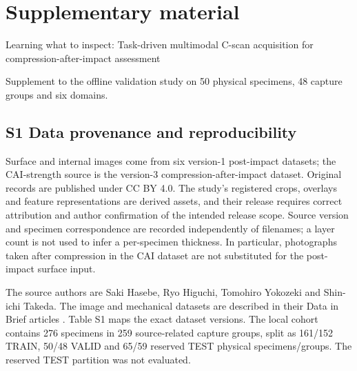 \documentclass[11pt,a4paper]{article}
\begin{document}
\section{Supplementary material}\label{supplementary-material}

Learning what to inspect: Task-driven multimodal C-scan acquisition for compression-after-impact assessment

Supplement to the offline validation study on 50 physical specimens, 48 capture groups and six domains.

\subsection{S1 Data provenance and reproducibility}\label{s1-data-provenance-and-reproducibility}

Surface and internal images come from six version-1 post-impact datasets; the CAI-strength source is the version-3 compression-after-impact dataset. Original records are published under CC BY 4.0. The study's registered crops, overlays and feature representations are derived assets, and their release requires correct attribution and author confirmation of the intended release scope. Source version and specimen correspondence are recorded independently of filenames; a layer count is not used to infer a per-specimen thickness. In particular, photographs taken after compression in the CAI dataset are not substituted for the post-impact surface input.

The source authors are Saki Hasebe, Ryo Higuchi, Tomohiro Yokozeki and Shin-ichi Takeda. The image and mechanical datasets are described in their Data in Brief articles \citep{hasebe2022data, hasebe2025data}. Table S1 maps the exact dataset versions. The local cohort contains 276 specimens in 259 source-related capture groups, split as 161/152 TRAIN, 50/48 VALID and 65/59 reserved TEST physical specimens/groups. The reserved TEST partition was not evaluated.
\end{document}
